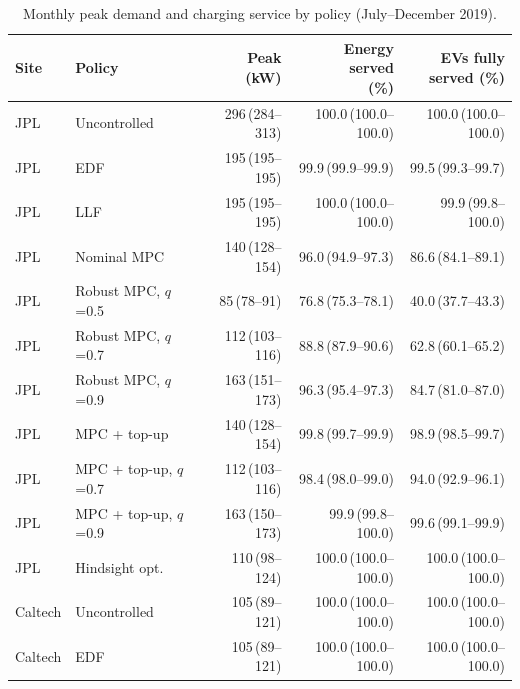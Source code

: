 \begin{table}[!htbp]
\centering
\caption{Monthly peak demand and charging service by policy (July--December 2019).}
\label{tab:service}
\footnotesize
\setlength{\tabcolsep}{1.5pt}
\begin{tabular*}{\textwidth}{@{\extracolsep{\fill}}llrrr@{}}
\hline
Site & Policy & \makecell[c]{Peak\\(kW)} & \makecell[c]{Energy served\\(\%)} & \makecell[c]{EVs fully\\served (\%)} \\
\hline
JPL & Uncontrolled & 296\,{\scriptsize(284--313)} & 100.0\,{\scriptsize(100.0--100.0)} & 100.0\,{\scriptsize(100.0--100.0)} \\
JPL & EDF & 195\,{\scriptsize(195--195)} & 99.9\,{\scriptsize(99.9--99.9)} & 99.5\,{\scriptsize(99.3--99.7)} \\
JPL & LLF & 195\,{\scriptsize(195--195)} & 100.0\,{\scriptsize(100.0--100.0)} & 99.9\,{\scriptsize(99.8--100.0)} \\
JPL & Nominal MPC & 140\,{\scriptsize(128--154)} & 96.0\,{\scriptsize(94.9--97.3)} & 86.6\,{\scriptsize(84.1--89.1)} \\
JPL & Robust MPC, $q$=0.5 & 85\,{\scriptsize(78--91)} & 76.8\,{\scriptsize(75.3--78.1)} & 40.0\,{\scriptsize(37.7--43.3)} \\
JPL & Robust MPC, $q$=0.7 & 112\,{\scriptsize(103--116)} & 88.8\,{\scriptsize(87.9--90.6)} & 62.8\,{\scriptsize(60.1--65.2)} \\
JPL & Robust MPC, $q$=0.9 & 163\,{\scriptsize(151--173)} & 96.3\,{\scriptsize(95.4--97.3)} & 84.7\,{\scriptsize(81.0--87.0)} \\
JPL & MPC + top-up & 140\,{\scriptsize(128--154)} & 99.8\,{\scriptsize(99.7--99.9)} & 98.9\,{\scriptsize(98.5--99.7)} \\
JPL & MPC + top-up, $q$=0.7 & 112\,{\scriptsize(103--116)} & 98.4\,{\scriptsize(98.0--99.0)} & 94.0\,{\scriptsize(92.9--96.1)} \\
JPL & MPC + top-up, $q$=0.9 & 163\,{\scriptsize(150--173)} & 99.9\,{\scriptsize(99.8--100.0)} & 99.6\,{\scriptsize(99.1--99.9)} \\
JPL & Hindsight opt. & 110\,{\scriptsize(98--124)} & 100.0\,{\scriptsize(100.0--100.0)} & 100.0\,{\scriptsize(100.0--100.0)} \\
\hline
Caltech & Uncontrolled & 105\,{\scriptsize(89--121)} & 100.0\,{\scriptsize(100.0--100.0)} & 100.0\,{\scriptsize(100.0--100.0)} \\
Caltech & EDF & 105\,{\scriptsize(89--121)} & 100.0\,{\scriptsize(100.0--100.0)} & 100.0\,{\scriptsize(100.0--100.0)} \\

\end{tabular*}
\end{table}

